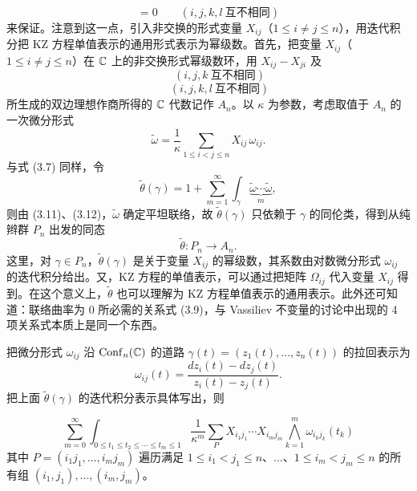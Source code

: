\begin{equation}
  [\Omega_{ij},\,\Omega_{kl}]=0
  \qquad (i,j,k,l\ \text{互不相同}) \tag{3.10}
\end{equation}
来保证。注意到这一点，引入非交换的形式变量 $X_{ij}$（$1\le i\ne j\le n$），用迭代积分把 KZ 方程单值表示的通用形式表示为幂级数。首先，把变量 $X_{ij}$（$1\le i\ne j\le n$）在 $\mathbb{C}$ 上的非交换形式幂级数环，用 $X_{ij}-X_{ji}$ 及
\begin{equation}
  [X_{ij}+X_{jk},\,X_{ik}] \qquad (i,j,k\ \text{互不相同}) \tag{3.11}
\end{equation}
\begin{equation}
  [X_{ij},\,X_{kl}] \qquad (i,j,k,l\ \text{互不相同}) \tag{3.12}
\end{equation}
所生成的双边理想作商所得的 $\mathbb{C}$ 代数记作 $A_n$。以 $\kappa$ 为参数，考虑取值于 $A_n$ 的一次微分形式
\[
  \tilde\omega=\frac{1}{\kappa}\sum_{1\le i<j\le n}X_{ij}\,\omega_{ij}.
\]
与式 (3.7) 同样，令
\[
  \tilde\theta(\gamma)=1+\sum_{m=1}^{\infty}\int_{\gamma}\underbrace{\tilde\omega\cdots\tilde\omega}_{m},
\]
则由 (3.11)、(3.12)，$\tilde\omega$ 确定平坦联络，故 $\tilde\theta(\gamma)$ 只依赖于 $\gamma$ 的同伦类，得到从纯辫群 $P_n$ 出发的同态
\[
  \tilde\theta\colon P_n\longrightarrow A_n .
\]
这里，对 $\gamma\in P_n$，$\tilde\theta(\gamma)$ 是关于变量 $X_{ij}$ 的幂级数，其系数由对数微分形式 $\omega_{ij}$ 的迭代积分给出。又，KZ 方程的单值表示，可以通过把矩阵 $\Omega_{ij}$ 代入变量 $X_{ij}$ 得到。在这个意义上，$\tilde\theta$ 也可以理解为 KZ 方程单值表示的通用表示。此外还可知道：联络曲率为 $0$ 所必需的关系式 (3.9)，与 Vassiliev 不变量的讨论中出现的 4 项关系式本质上是同一个东西。

把微分形式 $\omega_{ij}$ 沿 $\operatorname{Conf}_n(\mathbb{C})$ 的道路 $\gamma(t)=(z_1(t),\dots,z_n(t))$ 的拉回表示为
\begin{equation}
  \omega_{ij}(t)=\frac{dz_i(t)-dz_j(t)}{z_i(t)-z_j(t)} . \tag{3.13}
\end{equation}
把上面 $\tilde\theta(\gamma)$ 的迭代积分表示具体写出，则

\begin{equation}
  \sum_{m=0}^{\infty}\int_{0\le t_1\le t_2\le\cdots\le t_m\le 1}
  \frac{1}{\kappa^{m}}\sum_{P}X_{i_1j_1}\cdots X_{i_mj_m}
  \bigwedge_{k=1}^{m}\omega_{i_kj_k}(t_k) \tag{3.14}
\end{equation}
其中 $P=(i_1j_1,\dots,i_mj_m)$ 遍历满足 $1\le i_1<j_1\le n$、$\dots$、$1\le i_m<j_m\le n$ 的所有组 $(i_1,j_1),\dots,(i_m,j_m)$。

